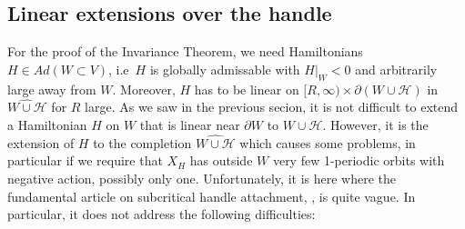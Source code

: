 \documentclass[a4paper,12pt,bibliography=totocnumbered,titlepage=false,abstracton,bookmarksnumbered=true]{scrartcl}
\theoremstyle{definition}
\begin{document}
\subsection{Linear extensions over the handle}\label{ExPsi}
For the proof of the Invariance Theorem, we need Hamiltonians $H\in Ad(W{\subset}V)$, i.e\ $H$ is globally admissable with $H|_W<0$ and arbitrarily large away from $W$. Moreover, $H$ has to be linear on $[R,\infty)\times\partial(W{\cup}\mathcal{H})$ in $\widehat{W{\cup}\mathcal{H}}$ for $R$ large. As we saw in the previous secion, it is not difficult to extend a Hamiltonian $H$ on $W$ that is linear near $\partial W$ to $W{\cup}\mathcal{H}$. However, it is the extension of $H$ to the completion $\widehat{W{\cup}\mathcal{H}}$ which causes some problems, in particular if we require that $X_H$ has outside $W$ very few 1-periodic orbits with negative action, possibly only one. Unfortunately, it is here where the fundamental article on subcritical handle attachment, \cite{Cie}, is quite vague. In particular, it does not address the following difficulties:
\end{document}
